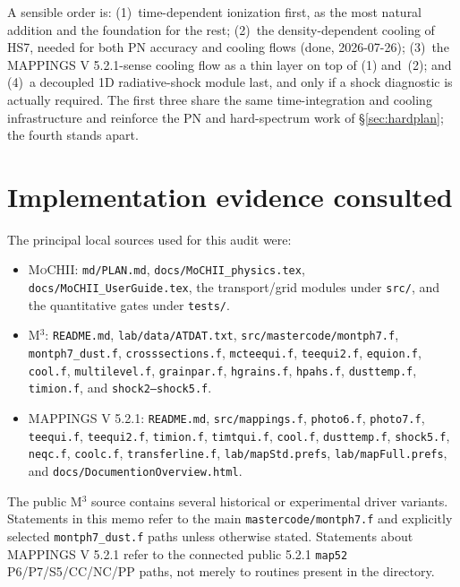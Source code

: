 \documentclass[english,a4paper]{my_memo}
\newcommand{\code}[1]{\texttt{#1}}
\newcommand{\MoCHII}{\textsc{MoCHII}}
\newcommand{\Mthree}{M$^3$}
\newcommand{\Mappings}{MAPPINGS V 5.2.1}
\begin{document}
\noindent A sensible order is: (1)~time-dependent ionization first, as the
most natural addition and the foundation for the rest; (2)~the
density-dependent cooling of HS7, needed for both PN accuracy and cooling
flows (done, 2026-07-26); (3)~the \Mappings{}-sense cooling flow as a thin
layer on top of (1) and~(2); and (4)~a decoupled 1D radiative-shock module
last, and only if a shock diagnostic is actually required.  The first three
share the
same time-integration and cooling infrastructure and reinforce the PN and
hard-spectrum work of \S\ref{sec:hardplan}; the fourth stands apart.

\section{Implementation evidence consulted}

The principal local sources used for this audit were:

\begin{itemize}[leftmargin=2em]
\item \MoCHII{}: \code{md/PLAN.md}, \code{docs/MoCHII\_physics.tex},
  \code{docs/MoCHII\_UserGuide.tex}, the transport/grid modules under
  \code{src/}, and the quantitative gates under \code{tests/}.
\item \Mthree{}: \code{README.md}, \code{lab/data/ATDAT.txt},
  \code{src/mastercode/montph7.f}, \code{montph7\_dust.f},
  \code{crosssections.f}, \code{mcteequi.f}, \code{teequi2.f},
  \code{equion.f}, \code{cool.f}, \code{multilevel.f},
  \code{grainpar.f}, \code{hgrains.f}, \code{hpahs.f},
  \code{dusttemp.f}, \code{timion.f}, and \code{shock2--shock5.f}.
\item \Mappings{}: \code{README.md}, \code{src/mappings.f},
  \code{photo6.f}, \code{photo7.f}, \code{teequi.f}, \code{teequi2.f},
  \code{timion.f}, \code{timtqui.f}, \code{cool.f}, \code{dusttemp.f},
  \code{shock5.f}, \code{neqc.f}, \code{coolc.f},
  \code{transferline.f}, \code{lab/mapStd.prefs},
  \code{lab/mapFull.prefs}, and \code{docs/DocumentionOverview.html}.
\end{itemize}

The public \Mthree{} source contains several historical or experimental
driver variants.  Statements in this memo refer to the main
\code{mastercode/montph7.f} and explicitly selected
\code{montph7\_dust.f} paths unless otherwise stated.
Statements about \Mappings{} refer to the connected public 5.2.1
\code{map52} P6/P7/S5/CC/NC/PP paths, not merely to routines present in
the directory.
\end{document}
